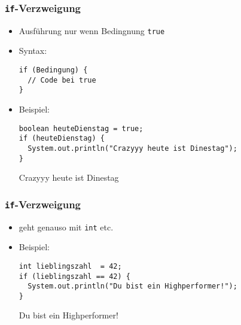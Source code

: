 \documentclass{../../presentation}
\begin{document}
\begin{frame}[fragile]
\begin{columns}
    \begin{column}{0.4\textwidth}
    \end{column}
  \end{columns}
\end{frame}





\begin{frame}[fragile]
  \frametitle{\texttt{if}-Verzweigung}

  \begin{itemize}
    \item<1-> Ausführung nur wenn Bedingnung \texttt{true}
    \item<1-> Syntax:
          \begin{verbatim}
if (Bedingung) {
  // Code bei true
}
      \end{verbatim}
    \item<2-> Beispiel:
          \begin{verbatim}
boolean heuteDienstag = true;
if (heuteDienstag) {
  System.out.println("Crazyyy heute ist Dinestag");
}
      \end{verbatim}
          \begin{ausgabe}
            Crazyyy heute ist Dinestag
          \end{ausgabe}
  \end{itemize}
\end{frame}

\begin{frame}[fragile]
  \frametitle{\texttt{if}-Verzweigung}

  \begin{itemize}
    \item<1-> geht genauso mit \texttt{int} etc.
    \item<2-> Beispiel:
          \begin{verbatim}
int lieblingszahl  = 42;
if (lieblingszahl == 42) {
  System.out.println("Du bist ein Highperformer!");
}
      \end{verbatim}
          \begin{ausgabe}
            Du bist ein Highperformer!
          \end{ausgabe}
  \end{itemize}
\end{frame}
\end{document}
